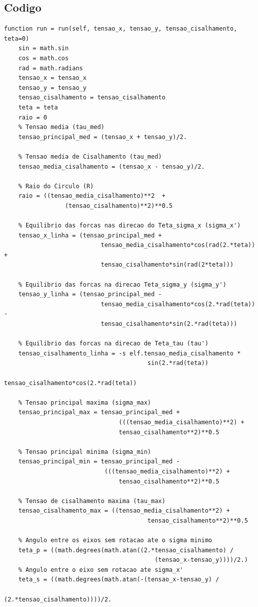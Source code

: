 \documentclass[a4paper]{article}
\begin{document}
\subsection{Codigo}

\begin{lstlisting}
function run = run(self, tensao_x, tensao_y, tensao_cisalhamento, teta=0)
    sin = math.sin
    cos = math.cos
    rad = math.radians
    tensao_x = tensao_x
    tensao_y = tensao_y
    tensao_cisalhamento = tensao_cisalhamento
    teta = teta
    raio = 0
    % Tensao media (tau_med)
    tensao_principal_med = (tensao_x + tensao_y)/2.

    % Tensao media de Cisalhamento (tau_med)
    tensao_media_cisalhamento = (tensao_x - tensao_y)/2.

    % Raio do Circulo (R)
    raio = ((tensao_media_cisalhamento)**2  + 
                 (tensao_cisalhamento)**2)**0.5

    % Equilibrio das forcas nas direcao do Teta_sigma_x (sigma_x')
    tensao_x_linha = (tensao_principal_med + 
                           tensao_media_cisalhamento*cos(rad(2.*teta)) +
                           tensao_cisalhamento*sin(rad(2*teta)))

    % Equilibrio das forcas na direcao Teta_sigma_y (sigma_y')
    tensao_y_linha = (tensao_principal_med - 
                           tensao_media_cisalhamento*cos(2.*rad(teta)) -
                           tensao_cisalhamento*sin(2.*rad(teta)))

    % Equilibrio das forcas na direcao de Teta_tau (tau')
    tensao_cisalhamento_linha = -s elf.tensao_media_cisalhamento * 
                                        sin(2.*rad(teta))                     
                                        tensao_cisalhamento*cos(2.*rad(teta))

    % Tensao principal maxima (sigma_max)
    tensao_principal_max = tensao_principal_med + 
                                (((tensao_media_cisalhamento)**2) + 
                                tensao_cisalhamento**2)**0.5

    % Tensao principal minima (sigma_min)
    tensao_principal_min = tensao_principal_med - 
                            (((tensao_media_cisalhamento)**2) + 
                                tensao_cisalhamento**2)**0.5

    % Tensao de cisalhamento maxima (tau_max)
    tensao_cisalhamento_max = ((tensao_media_cisalhamento**2) + 
                                        tensao_cisalhamento**2)**0.5

    % Angulo entre os eixos sem rotacao ate o sigma minimo
    teta_p = ((math.degrees(math.atan((2.*tensao_cisalhamento) /
                                          (tensao_x-tensao_y))))/2.)
    % Angulo entre o eixo sem rotacao ate sigma_x'
    teta_s = ((math.degrees(math.atan(-(tensao_x-tensao_y) /
                                          (2.*tensao_cisalhamento))))/2.
\end{lstlisting}
\end{document}
